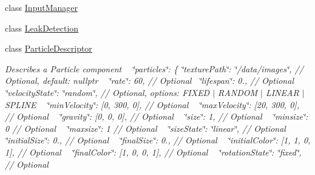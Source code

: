 \begin{DoxyCompactItemize}
\begin{DoxyCompactList}
 \end{DoxyCompactList}\item 
class \hyperlink{class_mason_1_1_input_manager}{Input\+Manager}
\item 
class \hyperlink{class_mason_1_1_leak_detection}{Leak\+Detection}
\item 
class \hyperlink{class_mason_1_1_particle_descriptor}{Particle\+Descriptor}
\begin{DoxyCompactList}\small\item\em Describes a Particle component ~\newline
 \char`\"{}particles\char`\"{}\+: \{ \char`\"{}texture\+Path\char`\"{}\+: \char`\"{}/data/images\char`\"{}, // Optional, default\+: nullptr ~\newline
 \char`\"{}rate\char`\"{}\+: 60, // Optional~\newline
 \char`\"{}lifespan\char`\"{}\+: 0., // Optional ~\newline
 \char`\"{}velocity\+State\char`\"{}\+: \char`\"{}random\char`\"{}, // Optional, options\+: F\+I\+X\+ED $\vert$ R\+A\+N\+D\+OM $\vert$ L\+I\+N\+E\+AR $\vert$ S\+P\+L\+I\+NE ~\newline
 \char`\"{}min\+Velocity\char`\"{}\+: \mbox{[}0, 300, 0\mbox{]}, // Optional ~\newline
 \char`\"{}max\+Velocity\char`\"{}\+: \mbox{[}20, 300, 0\mbox{]}, // Optional ~\newline
 \char`\"{}gravity\char`\"{}\+: \mbox{[}0, 0, 0\mbox{]}, // Optional ~\newline
 \char`\"{}size\char`\"{}\+: 1, // Optional ~\newline
 \char`\"{}minsize\char`\"{}\+: 0 // Optional ~\newline
 \char`\"{}maxsize\char`\"{}\+: 1 // Optional ~\newline
 \char`\"{}size\+State\char`\"{}\+: \char`\"{}linear\char`\"{}, // Optional ~\newline
 \char`\"{}initial\+Size\char`\"{}\+: 0., // Optional ~\newline
 \char`\"{}final\+Size\char`\"{}\+: 0., // Optional ~\newline
 \char`\"{}initial\+Color\char`\"{}\+: \mbox{[}1, 1, 0, 1\mbox{]}, // Optional ~\newline
 \char`\"{}final\+Color\char`\"{}\+: \mbox{[}1, 0, 0, 1\mbox{]}, // Optional ~\newline
 \char`\"{}rotation\+State\char`\"{}\+: \char`\"{}fixed\char`\"{}, // Optional ~\newline

\end{DoxyCompactList}
\end{DoxyCompactItemize}
